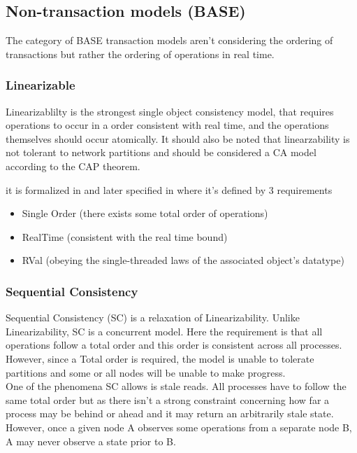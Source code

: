 \documentclass[a4paper,10pt,titlepage]{report}
\begin{document}
    \subsection{Non-transaction models (BASE)}
    The category of BASE transaction models aren't considering the ordering of transactions but rather the ordering of operations in real time.

    \subsubsection{Linearizable}
    Linearizablilty is the strongest single object consistency model, that requires operations to occur in a order consistent with real time, and the operations themselves should occur atomically. It should also be noted that linearzability is not tolerant to network partitions and should be considered a CA model according to the CAP theorem.

    it is formalized  in \cite{Linearizability} and later specified  in \cite{ConsistencyinNonTransactionalDistributedStorageSystems} where it's defined by 3 requirements


    \begin{itemize}
        \item Single Order (there exists some total order of operations)
        \item RealTime (consistent with the real time bound)
        \item RVal (obeying the single-threaded laws of the associated object's datatype)
    \end{itemize}


    \subsubsection{Sequential Consistency}
    Sequential Consistency (SC) is a relaxation of Linearizability. Unlike Linearizability, SC is a concurrent model. Here the requirement is that all operations follow a total order and this order is consistent across all processes. However, since a Total order is required, the model is unable to tolerate partitions and some or all nodes will be unable to make progress. \\

    One of the phenomena SC allows is stale reads. All processes have to follow the same total order but as there isn't a strong constraint concerning how far a process may be behind or ahead and it may return an arbitrarily stale state. However, once a given node A observes some operations from a separate node B, A may never observe a state prior to B.
\end{document}
